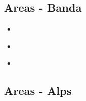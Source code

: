 \subsection{Areas - Banda}

\begin{scriptsize}
\begin{itemize}
\item[\twothousandnine]
\textcite{rohu09} \\
\item[\twothousandten]
\textcite{spha10} \\
\item[\twothousandtwentyone]
\textcite{scvg21} \\
\end{itemize}
\end{scriptsize}


\subsection{Areas - Alps}

